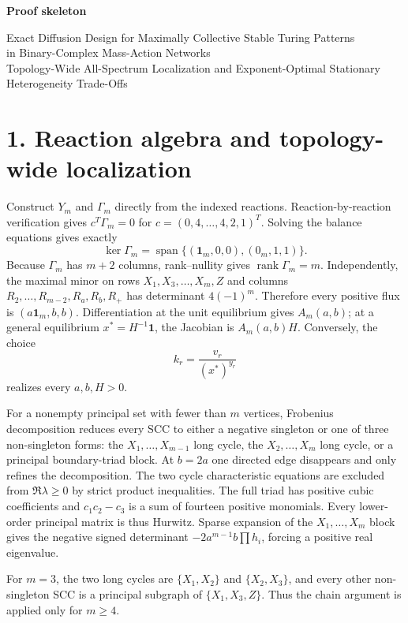 \documentclass[10pt]{article}
\begin{document}
\begin{center}
{\Large\bf Proof skeleton}\par
{\large Exact Diffusion Design for Maximally Collective Stable Turing Patterns}\\
{\normalsize in Binary-Complex Mass-Action Networks}\\
{\small Topology-Wide All-Spectrum Localization and
Exponent-Optimal Stationary Heterogeneity Trade-Offs}
\end{center}

\section*{1. Reaction algebra and topology-wide localization}
Construct $Y_m$ and $\Gamma_m$ directly from the indexed reactions.
Reaction-by-reaction verification gives $c^T\Gamma_m=0$ for
$c=(0,4,\ldots,4,2,1)^T$.  Solving the balance equations gives exactly
\[
\ker\Gamma_m=\operatorname{span}\{(\mathbf1_m,0,0),(0_m,1,1)\}.
\]
Because $\Gamma_m$ has $m+2$ columns, rank--nullity gives
$\operatorname{rank}\Gamma_m=m$.  Independently, the maximal minor on rows
$X_1,X_3,\ldots,X_m,Z$ and columns
$R_2,\ldots,R_{m-2},R_a,R_b,R_+$ has determinant $4(-1)^m$.
Therefore every positive flux is $(a\mathbf1_m,b,b)$.  Differentiation at the
unit equilibrium gives $A_m(a,b)$; at a general equilibrium
$x^*=H^{-1}\mathbf1$, the Jacobian is $A_m(a,b)H$.  Conversely, the choice
\[
 k_r=\frac{v_r}{(x^*)^{y_r}}
\]
realizes every $a,b,H>0$.

For a nonempty principal set with fewer than $m$ vertices, Frobenius decomposition reduces every SCC to either a negative singleton or one of three non-singleton forms: the $X_1,\ldots,X_{m-1}$ long cycle, the $X_2,\ldots,X_m$ long cycle, or a principal boundary-triad block. At $b=2a$ one directed edge disappears and only refines the decomposition. The two cycle characteristic equations are excluded from $\Re\lambda\ge0$ by strict product inequalities. The full triad has positive cubic coefficients and $c_1c_2-c_3$ is a sum of fourteen positive monomials. Every lower-order principal matrix is thus Hurwitz. Sparse expansion of the $X_1,\ldots,X_m$ block gives the negative signed determinant $-2a^{m-1}b\prod h_i$, forcing a positive real eigenvalue.

For $m=3$, the two long cycles are $\{X_1,X_2\}$ and $\{X_2,X_3\}$,
and every other non-singleton SCC is a principal subgraph of
$\{X_1,X_3,Z\}$.  Thus the chain argument is applied only for $m\ge4$.
\end{document}
